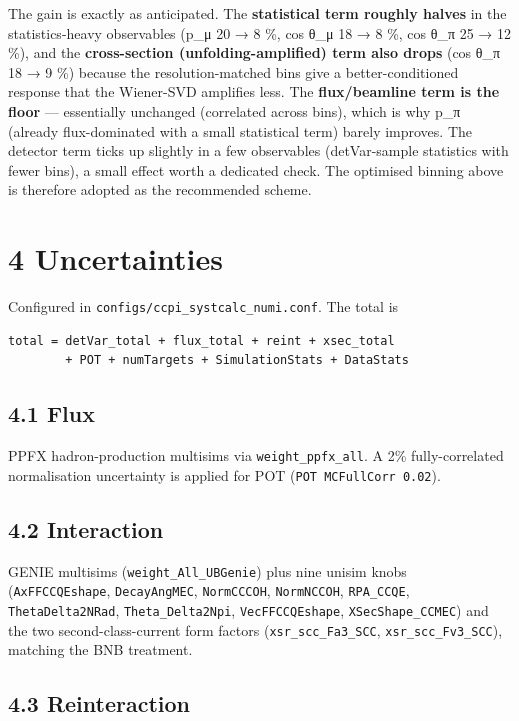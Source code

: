\documentclass[11pt]{article}
\begin{document}
The gain is exactly as anticipated. The \textbf{statistical term roughly halves} in the statistics-heavy observables (p\_μ 20 → 8 \%, cos θ\_μ 18 → 8 \%, cos θ\_π 25 → 12 \%), and the \textbf{cross-section (unfolding-amplified) term also drops} (cos θ\_π 18 → 9 \%) because the resolution-matched bins give a better-conditioned response that the Wiener-SVD amplifies less. The \textbf{flux/beamline term is the floor} — essentially unchanged (correlated across bins), which is why p\_π (already flux-dominated with a small statistical term) barely improves. The detector term ticks up slightly in a few observables (detVar-sample statistics with fewer bins), a small effect worth a dedicated check. The optimised binning above is therefore adopted as the recommended scheme.

\section*{4 Uncertainties}

Configured in \texttt{configs/ccpi\_systcalc\_numi.conf}. The total is

\begin{verbatim}
total = detVar_total + flux_total + reint + xsec_total
        + POT + numTargets + SimulationStats + DataStats
\end{verbatim}

\subsection*{4.1 Flux}

PPFX hadron-production multisims via \texttt{weight\_ppfx\_all}. A 2\% fully-correlated normalisation uncertainty is applied for POT (\texttt{POT MCFullCorr 0.02}).

\subsection*{4.2 Interaction}

GENIE multisims (\texttt{weight\_All\_UBGenie}) plus nine unisim knobs (\texttt{AxFFCCQEshape}, \texttt{DecayAngMEC}, \texttt{NormCCCOH}, \texttt{NormNCCOH}, \texttt{RPA\_CCQE}, \texttt{ThetaDelta2NRad}, \texttt{Theta\_Delta2Npi}, \texttt{VecFFCCQEshape}, \texttt{XSecShape\_CCMEC}) and the two second-class-current form factors (\texttt{xsr\_scc\_Fa3\_SCC}, \texttt{xsr\_scc\_Fv3\_SCC}), matching the BNB treatment.

\subsection*{4.3 Reinteraction}
\end{document}
